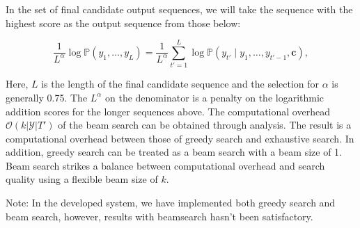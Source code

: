 In the set of final candidate output sequences, we will take the sequence with the highest score as the output sequence from those below:

$$ \frac{1}{L^\alpha} \log \mathbb{P}(y_1, \ldots, y_{L}) = \frac{1}{L^\alpha} \sum_{t'=1}^L \log \mathbb{P}(y_{t'} \mid y_1, \ldots, y_{t'-1}, \boldsymbol{c}),$$

Here, $L$ is the length of the final candidate sequence and the selection for $\alpha$ is generally 0.75. The $L^\alpha$ on the denominator is a penalty on the logarithmic addition scores for the longer sequences above. The computational overhead $\mathcal{O}(k\left|\mathcal{Y}\right|T')$ of the beam search can be obtained through analysis. The result is a computational overhead between those of greedy search and exhaustive search. In addition, greedy search can be treated as a beam search with a beam size of 1. Beam search strikes a balance between computational overhead and search quality using a flexible beam size of $k$.

Note: In the developed system, we have implemented both greedy search and beam search, however, results with beamsearch hasn't been satisfactory. 

